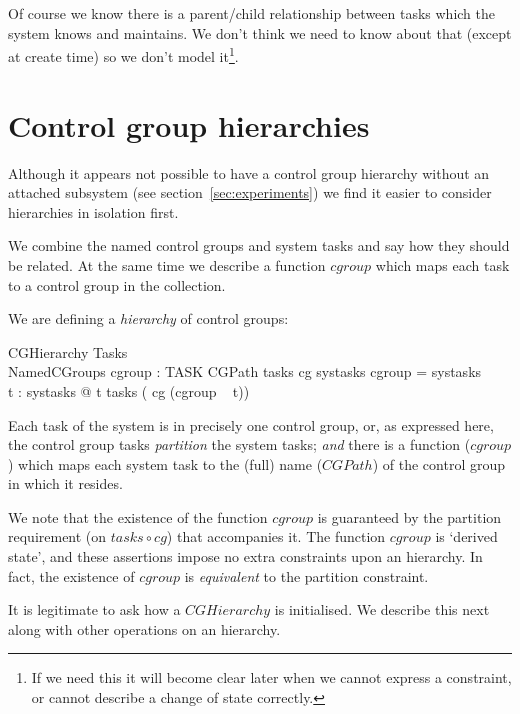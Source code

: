 \documentclass[a4paper,twoside,12pt]{article}
\begin{document}
Of course we know there is a parent/child relationship between tasks which the system knows and maintains. 
We don't think we need to know about that (except at create time) so we don't model 
it\footnote{If we need this it will become clear later when we cannot express a constraint, 
or cannot describe a change of state correctly.}.

\section{Control group hierarchies}

Although it appears not possible to have a control group hierarchy without an attached subsystem 
(see section~\ref{sec:experiments}) we find it easier to consider hierarchies in isolation first.

We combine the named control groups and system tasks and say how they should be related. 
At the same time we describe a function $cgroup$ which maps each task to a control group in the collection.

We are defining a \emph{hierarchy} of control groups:

\begin{schema}{CGHierarchy}
Tasks \\
NamedCGroups
\also
cgroup : TASK \ffun CGPath
\where
tasks \circ cg \partition systasks
\also
\dom cgroup = systasks \\
\forall t : systasks @ t \in tasks ( cg (cgroup ~ t))
\end{schema}
Each task of the system is in precisely one control group, or, as expressed here, 
the control group tasks \emph{partition} the system tasks; 
\emph{and} there is a function ($cgroup$) which maps each system task to the (full) name 
($CGPath$) of the control group in which it resides.

We note that the existence of the function $cgroup$ is guaranteed by the partition requirement 
(on $tasks \circ cg$) that accompanies it. 
The function $cgroup$ is `derived state', and these assertions impose no extra constraints upon an hierarchy. 
In fact, the existence of $cgroup$ is \emph{equivalent} to the partition constraint.

It is legitimate to ask how a $CGHierarchy$ is initialised. 
We describe this next along with other operations on an hierarchy.


\end{document}
